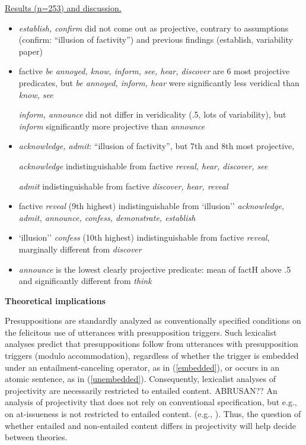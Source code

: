 \documentclass[12pt,fleqn]{article}
\newcommand{\6}{\mbox{$[\hspace*{-.6mm}[$}}
\newcommand{\9}{\mbox{$]\hspace*{-.6mm}]$}}
\begin{document}
\underline{Results (n=253) and discussion.} 

\begin{itemize}

\item {\em establish, confirm} did not come out as projective, contrary to assumptions (confirm: ``illusion of factivity'') and previous findings (establish, variability paper)

\item factive {\em be annoyed, know, inform, see, hear, discover} are 6 most projective predicates, but {\em be annoyed, inform, hear} were significantly less veridical than {\em know, see} 

{\em inform, announce} did not differ in veridicality (.5, lots of variability), but {\em inform} significantly more projective than {\em announce} 

\item {\em acknowledge, admit}: ``illusion of factivity'', but 7th and 8th most projective, 

{\em acknowledge} indistinguishable from factive {\em reveal, hear, discover, see}

{\em admit} indistinguishable from factive {\em discover, hear, reveal}

\item factive {\em reveal} (9th highest) indistinguishable from `illusion'' {\em acknowledge, admit, announce, confess, demonstrate, establish}

\item `illusion'' {\em confess} (10th highest) indistinguishable from factive {\em reveal}, marginally different from {\em discover}

\item {\em announce} is the lowest clearly projective predicate: mean of factH above .5 and significantly different from {\em think}



\end{itemize}

{\bf Theoretical implications}

Presuppositions are standardly analyzed as conventionally specified conditions on the felicitous use of utterances with presupposition triggers. Such lexicalist analyses predict that presuppositions follow from utterances with presupposition triggers (modulo accommodation), regardless of whether the trigger is embedded under an entailment-canceling operator, as in (\ref{embedded}), or occurs in an atomic sentence, as in (\ref{unembedded}). Consequently, lexicalist analyses of projectivity are necessarily restricted to entailed content. ABRUSAN?? An analysis of projectivity that does not rely on conventional specification, but e.g., on at-issueness is not restricted to entailed content. (e.g., \citealt{brst-salt10,brst-ar,abrusan2011,abrusan2013}). Thus, the question of whether entailed and non-entailed content differs in projectivity will help decide between theories. 
\end{document}
